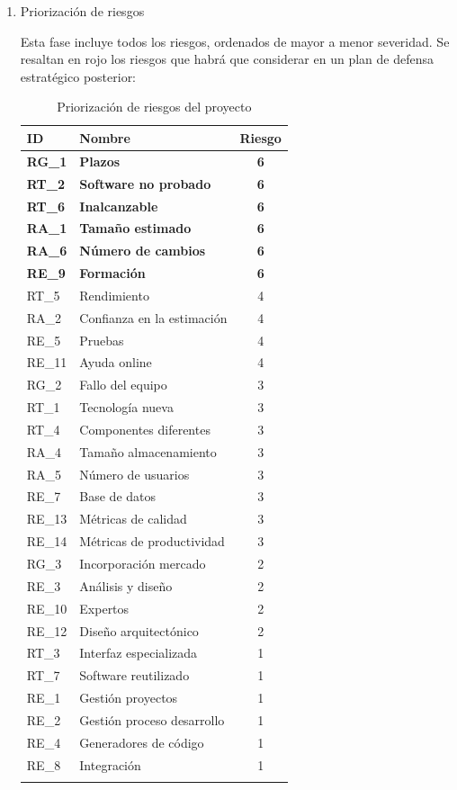 \begin{enumerate}
\begin{itemize}
\endgroup

\end{itemize}

\item Priorización de riesgos \par
Esta fase incluye todos los riesgos, ordenados de mayor a menor severidad. Se resaltan en rojo los riesgos que habrá que considerar en un plan de defensa estratégico posterior:


\begingroup
\renewcommand\arraystretch{1.3}

\begin{longtable}{l p{5cm} c}
\hline
\textbf{ID} & \textbf{Nombre} & \textbf{Riesgo} \\
\hline
\endhead
\endfoot
\textbf{RG\_1} & 
\textbf{Plazos} &
\textbf{6} 
 \\
\textbf{RT\_2} & 
\textbf{Software no probado} &
\textbf{6} 
 \\
\textbf{RT\_6} & 
\textbf{Inalcanzable} &
\textbf{6} 
 \\
\textbf{RA\_1} & 
\textbf{Tamaño estimado} &
\textbf{6} 
 \\
\textbf{RA\_6} & 
\textbf{Número de cambios} &
\textbf{6} 
 \\
\textbf{RE\_9} & 
\textbf{Formación} &
\textbf{6} 
 \\
 
RT\_5 & 
Rendimiento &
4 
 \\
RA\_2 & 
Confianza en la estimación &
4 
 \\
RE\_5 & 
Pruebas &
4 
 \\
RE\_11 & 
Ayuda online &
4 
 \\
RG\_2 & 
Fallo del equipo &
3 
 \\
RT\_1 & 
Tecnología nueva &
3 
 \\
RT\_4 & 
Componentes diferentes &
3 
 \\
RA\_4 & 
Tamaño almacenamiento &
3 
 \\
RA\_5 & 
Número de usuarios &
3 
 \\
RE\_7 & 
Base de datos &
3 
 \\
RE\_13 & 
Métricas de calidad &
3 
 \\
RE\_14 & 
Métricas de productividad &
3 
 \\
RG\_3 & 
Incorporación mercado &
2 
 \\
RE\_3 & 
Análisis y diseño &
2 
 \\
RE\_10 & 
Expertos &
2 
 \\
RE\_12 & 
Diseño arquitectónico &
2 
 \\
RT\_3 & 
Interfaz especializada &
1 
 \\
RT\_7 & 
Software reutilizado &
1 
 \\
RE\_1 & 
Gestión proyectos &
1 
 \\
RE\_2 & 
Gestión proceso desarrollo &
1 
 \\
RE\_4 & 
Generadores de código &
1 
 \\
RE\_8 & 
Integración &
1 
 \\
\hline
\caption{Priorización de riesgos del proyecto}\label{prioriz_riesg}\\
\end{longtable}


\end{enumerate}
